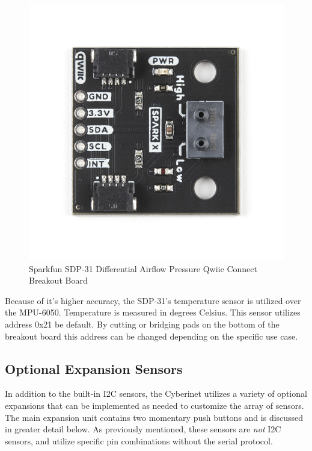 \begin{center}
    \begin{figure}
        \centering
        \includegraphics[scale=1.5, angle=90]{diagrams/oem/spd31.jpg}
        \caption{Sparkfun SDP-31 Differential Airflow Pressure Qwiic Connect Breakout Board}
        \label{fig:sdp-31}
    \end{figure}
\end{center}

Because of it’s higher accuracy, the SDP-31’s temperature sensor is utilized over the MPU-6050. Temperature is measured in degrees Celsius. This sensor utilizes address 0x21 be default. By cutting or bridging pads on the bottom of the breakout board this address can be changed depending on the specific use case.




\subsection{Optional Expansion Sensors}
In addition to the built-in I2C sensors, the Cyberinet utilizes a variety of optional expansions that can be implemented as needed to customize the array of sensors. The main expansion unit contains two momentary push buttons and is discussed in greater detail below. As previously mentioned, these sensors are \emph{not} I2C sensors, and utilize specific pin combinations without the serial protocol.

